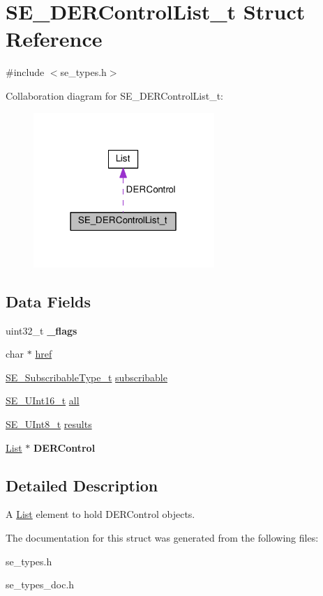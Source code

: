 \hypertarget{structSE__DERControlList__t}{}\section{S\+E\+\_\+\+D\+E\+R\+Control\+List\+\_\+t Struct Reference}
\label{structSE__DERControlList__t}


{\ttfamily \#include $<$se\+\_\+types.\+h$>$}



Collaboration diagram for S\+E\+\_\+\+D\+E\+R\+Control\+List\+\_\+t\+:\nopagebreak
\begin{figure}[H]
\begin{center}
\leavevmode
\includegraphics[width=194pt]{structSE__DERControlList__t__coll__graph}
\end{center}
\end{figure}
\subsection*{Data Fields}
\begin{DoxyCompactItemize}
\item 
uint32\+\_\+t {\bfseries \+\_\+flags}
\item 
char $\ast$ \hyperlink{group__DERControlList_ga8ae02ab34efcdc073153919ae8ab74f5}{href}
\item 
\hyperlink{group__SubscribableType_ga5c41f553d369710ed34619266bf2551e}{S\+E\+\_\+\+Subscribable\+Type\+\_\+t} \hyperlink{group__DERControlList_ga870a4642c096dbebeffa0037894b9b41}{subscribable}
\item 
\hyperlink{group__UInt16_gac68d541f189538bfd30cfaa712d20d29}{S\+E\+\_\+\+U\+Int16\+\_\+t} \hyperlink{group__DERControlList_ga8f6118a4748b4550bf653a93d1586688}{all}
\item 
\hyperlink{group__UInt8_gaf7c365a1acfe204e3a67c16ed44572f5}{S\+E\+\_\+\+U\+Int8\+\_\+t} \hyperlink{group__DERControlList_gafeb66f551894913e0d3916884e8d506a}{results}
\item 
\hyperlink{structList}{List} $\ast$ {\bfseries D\+E\+R\+Control}
\end{DoxyCompactItemize}


\subsection{Detailed Description}
A \hyperlink{structList}{List} element to hold D\+E\+R\+Control objects. 

The documentation for this struct was generated from the following files\+:\begin{DoxyCompactItemize}
\item 
se\+\_\+types.\+h\item 
se\+\_\+types\+\_\+doc.\+h\end{DoxyCompactItemize}
